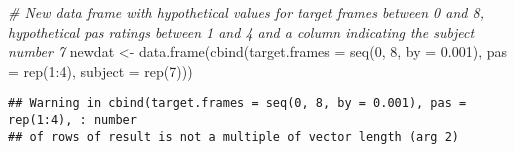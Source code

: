 \documentclass[
]{article}
\newenvironment{Shaded}{\begin{snugshade}}{\end{snugshade}}
\newcommand{\AttributeTok}[1]{\textcolor[rgb]{0.77,0.63,0.00}{#1}}
\newcommand{\CommentTok}[1]{\textcolor[rgb]{0.56,0.35,0.01}{\textit{#1}}}
\newcommand{\DecValTok}[1]{\textcolor[rgb]{0.00,0.00,0.81}{#1}}
\newcommand{\FloatTok}[1]{\textcolor[rgb]{0.00,0.00,0.81}{#1}}
\newcommand{\FunctionTok}[1]{\textcolor[rgb]{0.00,0.00,0.00}{#1}}
\newcommand{\NormalTok}[1]{#1}
\newcommand{\OtherTok}[1]{\textcolor[rgb]{0.56,0.35,0.01}{#1}}
\newcommand{\SpecialCharTok}[1]{\textcolor[rgb]{0.00,0.00,0.00}{#1}}
\newcommand{\StringTok}[1]{\textcolor[rgb]{0.31,0.60,0.02}{#1}}
\begin{document}
\begin{Shaded}
\begin{Highlighting}[]
\CommentTok{\# New data frame with hypothetical values for target frames between 0 and 8, hypothetical pas ratings between 1 and 4 and a column indicating the subject number 7}
\NormalTok{newdat }\OtherTok{\textless{}{-}} \FunctionTok{data.frame}\NormalTok{(}\FunctionTok{cbind}\NormalTok{(}\StringTok{\textquotesingle{}target.frames\textquotesingle{}} \OtherTok{=} \FunctionTok{seq}\NormalTok{(}\DecValTok{0}\NormalTok{, }\DecValTok{8}\NormalTok{, }\AttributeTok{by =} \FloatTok{0.001}\NormalTok{), }\StringTok{\textquotesingle{}pas\textquotesingle{}} \OtherTok{=} \FunctionTok{rep}\NormalTok{(}\DecValTok{1}\SpecialCharTok{:}\DecValTok{4}\NormalTok{), }\StringTok{\textquotesingle{}subject\textquotesingle{}} \OtherTok{=} \FunctionTok{rep}\NormalTok{(}\StringTok{\textquotesingle{}7\textquotesingle{}}\NormalTok{)))}
\end{Highlighting}
\end{Shaded}

\begin{verbatim}
## Warning in cbind(target.frames = seq(0, 8, by = 0.001), pas = rep(1:4), : number
## of rows of result is not a multiple of vector length (arg 2)
\end{verbatim}
\end{document}
